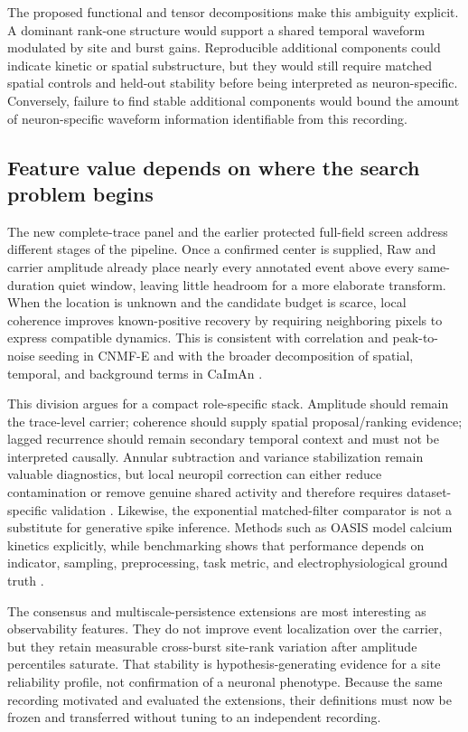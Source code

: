 The proposed functional and tensor decompositions make this ambiguity explicit. A dominant rank-one structure would support a shared temporal waveform modulated by site and burst gains. Reproducible additional components could indicate kinetic or spatial substructure, but they would still require matched spatial controls and held-out stability before being interpreted as neuron-specific. Conversely, failure to find stable additional components would bound the amount of neuron-specific waveform information identifiable from this recording.

\subsection{Feature value depends on where the search problem begins}

The new complete-trace panel and the earlier protected full-field screen address
different stages of the pipeline. Once a confirmed center is supplied, Raw and
carrier amplitude already place nearly every annotated event above every
same-duration quiet window, leaving little headroom for a more elaborate
transform. When the location is unknown and the candidate budget is scarce,
local coherence improves known-positive recovery by requiring neighboring
pixels to express compatible dynamics. This is consistent with correlation and
peak-to-noise seeding in CNMF-E and with the broader decomposition of spatial,
temporal, and background terms in CaImAn
\citep{zhou2018cnmfe,giovannucci2019caiman}.

This division argues for a compact role-specific stack. Amplitude should remain
the trace-level carrier; coherence should supply spatial proposal/ranking
evidence; lagged recurrence should remain secondary temporal context and must
not be interpreted causally. Annular subtraction and variance stabilization
remain valuable diagnostics, but local neuropil correction can either reduce
contamination or remove genuine shared activity and therefore requires
dataset-specific validation \citep{keemink2018fissa}. Likewise, the exponential
matched-filter comparator is not a substitute for generative spike inference.
Methods such as OASIS model calcium kinetics explicitly, while benchmarking
shows that performance depends on indicator, sampling, preprocessing, task
metric, and electrophysiological ground truth
\citep{friedrich2017oasis,berens2018benchmarking}.

The consensus and multiscale-persistence extensions are most interesting as
observability features. They do not improve event localization over the carrier,
but they retain measurable cross-burst site-rank variation after amplitude
percentiles saturate. That stability is hypothesis-generating evidence for a
site reliability profile, not confirmation of a neuronal phenotype. Because
the same recording motivated and evaluated the extensions, their definitions
must now be frozen and transferred without tuning to an independent recording.

